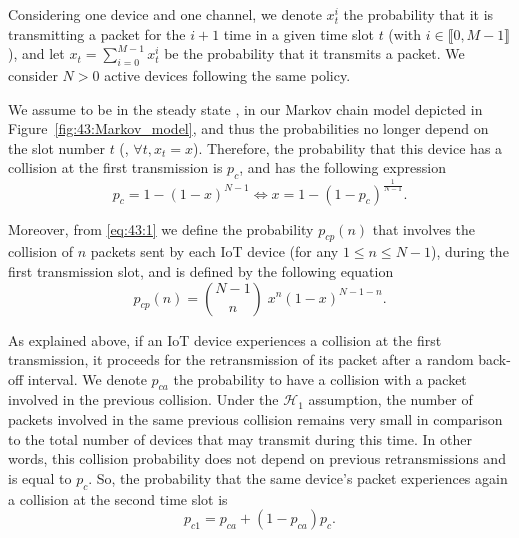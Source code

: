 Considering one device and one channel,
we denote $x_t^i$ the probability that it is transmitting a packet for the $i+1$ time in a given time slot $t$ (with $i\in \llbracket 0, M-1 \rrbracket$),
and let $x_t = \sum_{i=0}^{M-1}x_t^i$ be the probability that it transmits a packet.
We consider $N > 0$ active devices following the same policy.

%

We assume to be in the steady state \cite{Norris98}, in our Markov chain model depicted in Figure~\ref{fig:43:Markov_model}, and thus the probabilities no longer depend on the slot number $t$ (\ie, $\forall t, x_t=x$).
Therefore, the probability that this device has a collision at the first transmission is $p_c$, and has the following expression
\begin{equation}\label{eq:43:1}
	p_c = 1-\left(1-x\right)^{N-1} \iff x = 1-\left(1-p_c\right)^{\frac{1}{N-1}}.
\end{equation}

Moreover, from \eqref{eq:43:1} we define the probability $p_{cp}(n)$ that involves the collision of $n$ packets sent by each IoT device (for any $1\leq n \leq N-1$), during the first transmission slot, and is defined by the following equation
\begin{equation*}\label{eq:43:2}
	p_{cp}(n) = {N-1 \choose n} \; x^n \left(1-x\right)^{N-1-n}.
\end{equation*}

As explained above, if an IoT device experiences a collision at the first transmission, it proceeds for the retransmission of its packet after a random back-off interval.
We denote $p_{ca}$ the probability to have a collision with a packet involved in the previous collision.
Under the $\mathcal{H}_{1}$ assumption, the number of packets involved in the same previous collision remains very small in comparison to the total number of devices that may transmit during this time. In other words, this collision probability does not depend on previous retransmissions and is equal to $p_c$.
So, the probability that the same device's packet experiences again a collision at the second time slot is
%
\begin{equation}\label{eq:43:decomppc1}
	p_{c1} = p_{ca}+\left(1-p_{ca} \right)p_c.
\end{equation}


